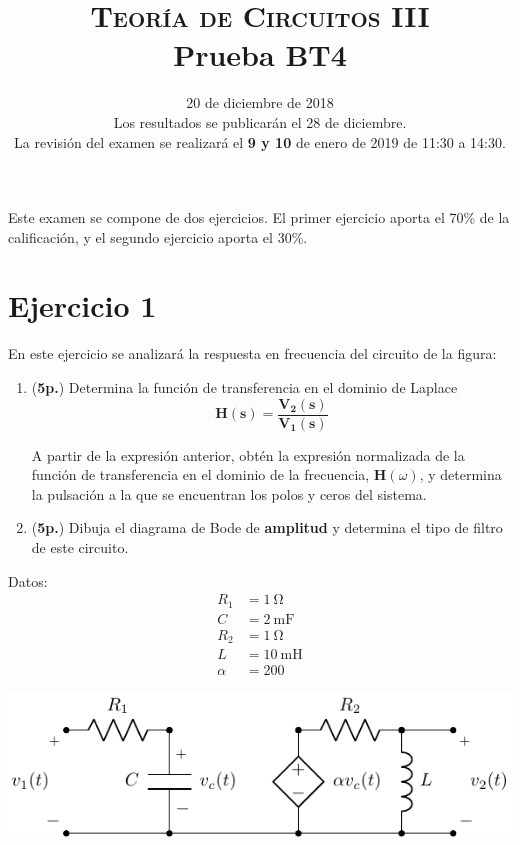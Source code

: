 \documentclass[12pt]{article}
\newcommand{\laplace}[1]{\mathbf{#1}(\mathbf{s})}
\begin{document}
\title{\textsc{Teoría de Circuitos III}\\Prueba BT4}

\date{20 de diciembre de  2018\\\small{Los resultados se publicarán el 28 de diciembre.\\La revisión del examen se realizará el  \textbf{9 y 10} de enero de 2019 de 11:30 a 14:30.}}

\maketitle

Este examen se compone de dos ejercicios. El primer ejercicio aporta el 70\% de la calificación, y el segundo ejercicio aporta el 30\%.

\section*{Ejercicio 1}

En este ejercicio se analizará la respuesta en frecuencia del circuito de la
figura:

\begin{enumerate}
  \item (\textbf{5p.}) Determina la función de transferencia en el dominio de Laplace
  \[
    \laplace{H} = \frac{\laplace{V_2}}{\laplace{V_1}}
  \]

A partir de la expresión anterior, obtén la expresión normalizada de la función de transferencia en el dominio de la frecuencia, $\mathbf{H}(\omega)$, y determina la pulsación a la que se encuentran los polos y ceros del sistema.

\item (\textbf{5p.}) Dibuja el diagrama de Bode de \textbf{amplitud} y determina el tipo de filtro de este circuito.

\end{enumerate}


\begin{minipage}{0.3\textwidth}
Datos:
\begin{align*}
  R_1 &= \SI{1}{\ohm}\\
  C &= \SI{2}{\milli\farad}\\
  R_2 &= \SI{1}{\ohm}\\
  L &= \SI{10}{\milli\henry}\\
  \alpha &= 200
\end{align*}
\end{minipage}
\begin{minipage}{0.7\textwidth}
\includegraphics{figs/E4_circuito_frecuencia.pdf}
\end{minipage}
\end{document}
